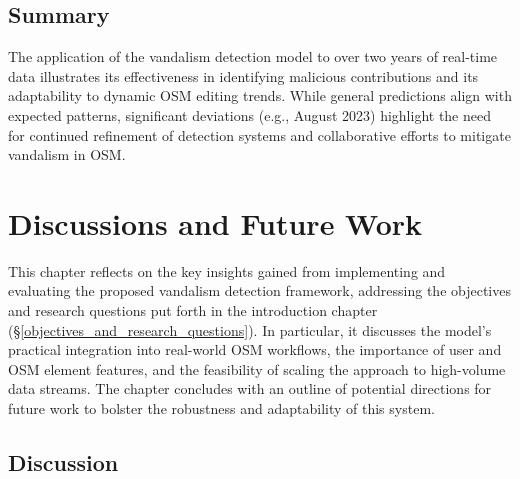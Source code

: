 \documentclass[
    13pt, %
    a4paper, %
    listof=totoc, %
    bibliography=totoc, %
    index=totoc, %
    headsepline
]{scrreprt}
\begin{document}
\section{Summary}
The application of the vandalism detection model to over two years of real-time data illustrates its effectiveness in identifying malicious contributions and its adaptability to dynamic OSM editing trends. While general predictions align with expected patterns, significant deviations (e.g., August 2023) highlight the need for continued refinement of detection systems and collaborative efforts to mitigate vandalism in OSM.

\chapter{Discussions and Future Work}
\label{chapter:discussions_and_future_work}

This chapter reflects on the key insights gained from implementing and evaluating the proposed vandalism detection framework, addressing the objectives and research questions put forth in the introduction chapter (\S\ref{objectives_and_research_questions}). In particular, it discusses the model’s practical integration into real-world OSM workflows, the importance of user and OSM element features, and the feasibility of scaling the approach to high-volume data streams. The chapter concludes with an outline of potential directions for future work to bolster the robustness and adaptability of this system.

\section{Discussion}
\label{sec:discussion}
\end{document}
